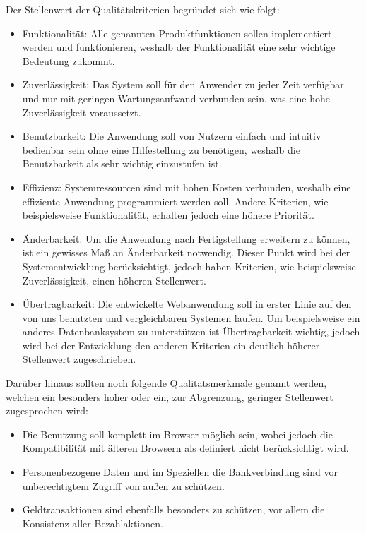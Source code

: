 \documentclass[a4paper]{scrreprt}
\begin{document}
Der Stellenwert der Qualitätskriterien begründet sich wie folgt:
    	\begin{itemize}
    		\item Funktionalität: Alle genannten Produktfunktionen sollen implementiert werden und funktionieren, weshalb der Funktionalität eine sehr wichtige Bedeutung zukommt.
    		\item Zuverlässigkeit: Das System soll für den Anwender zu jeder Zeit verfügbar und nur mit geringen Wartungsaufwand verbunden sein, was eine hohe Zuverlässigkeit voraussetzt.
    		\item Benutzbarkeit: Die Anwendung soll von Nutzern einfach und intuitiv bedienbar sein ohne eine Hilfestellung zu benötigen, weshalb die Benutzbarkeit als sehr wichtig einzustufen ist.
    		\item Effizienz: Systemressourcen sind mit hohen Kosten verbunden, weshalb eine effiziente Anwendung programmiert werden soll. Andere Kriterien, wie beispielsweise Funktionalität, erhalten jedoch eine höhere Priorität.
    		\item Änderbarkeit: Um die Anwendung nach Fertigstellung erweitern zu können, ist ein gewisses Maß an Änderbarkeit notwendig. Dieser Punkt wird bei der Systementwicklung berücksichtigt, jedoch haben Kriterien, wie beispielsweise Zuverlässigkeit, einen höheren Stellenwert.
    		\item Übertragbarkeit: Die entwickelte Webanwendung soll in erster Linie auf den von uns benutzten und vergleichbaren Systemen laufen. Um beispielsweise ein anderes Datenbanksystem zu unterstützen ist Übertragbarkeit wichtig, jedoch wird bei der Entwicklung den anderen Kriterien ein deutlich höherer Stellenwert zugeschrieben.
    	\end{itemize}
	Darüber hinaus sollten noch folgende Qualitätsmerkmale genannt werden, welchen ein besonders hoher oder ein, zur Abgrenzung, geringer Stellenwert zugesprochen wird:
		\begin{itemize}
		 	\item Die Benutzung soll komplett im Browser möglich sein, wobei jedoch die Kompatibilität mit älteren Browsern als definiert nicht berücksichtigt wird.
		 	\item Personenbezogene Daten und im Speziellen die Bankverbindung sind vor unberechtigtem Zugriff von außen zu schützen.
		 	\item Geldtransaktionen sind ebenfalls besonders zu schützen, vor allem die Konsistenz aller Bezahlaktionen.
 \end{itemize}
 
\end{document}
